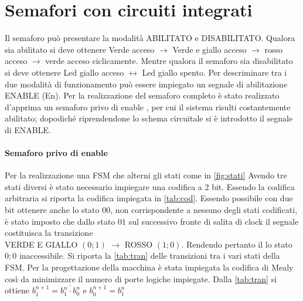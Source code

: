 \documentclass[a4paper,11pt]{article}
\begin{document}
\section{Semafori con circuiti integrati }
Il semaforo può presentare la modalità ABILITATO e DISABILITATO. Qualora sia abilitato si deve 
ottenere Verde acceso $\longrightarrow$ Verde e 
giallo acceso $\longrightarrow$ rosso acceso $\longrightarrow$ 
verde acceso  ciclicamente. Mentre qualora il semaforo sia disabilitato si deve ottenere
Led giallo acceso $\leftrightarrow$ Led giallo spento.
Per descriminare tra i due modalità di funzionamento può essere impiegato un segnale di abilitazione 
ENABLE (En).
Per la realizzazione del semaforo completo è stato realizzato d'apprima un semaforo privo di enable , per cui il sistema risulti costantemente abilitato;
dopodiché riprendendone lo schema circuitale si è introdotto il segnale di ENABLE.
\paragraph{Semaforo privo di enable}
Per la realizzazione una FSM che alterni gli stati come in \figurename{\ref{fig:stati}}
Avendo tre stati diversi è stato necessario impiegare una codifica a 2 bit.
Essendo la codifica arbitraria si riporta la codifica impiegata in 
\tablename{\ref{tab:cod}}.
Essendo possibile con due bit ottenere anche lo stato $00$,  non corrispondente a nessuno degli stati codificati,
è stato imposto che dallo stato $01$ sul successivo fronte di salita di clock il segnale costituisca
la transizione \\VERDE E GIALLO $(0;1)$  $\longrightarrow$ ROSSO $(1;0)$.
Rendendo pertanto il lo stato $0;0$ inaccessibile.
Si riporta la \tablename{ \ref{tab:tran}} delle transizioni tra i vari stati della FSM.
Per la progettazione della macchina è stata impiegata la codifica di Mealy così da minimizzare il numero di porte logiche impiegate.
Dalla \tablename{ \ref{tab:tran}} si ottiene  $b_{1}^{n+1} =  \overline{b_{1}^{n} \cdot b_{0}^{n}}$ e $b_{0}^{n+1} = b_{1}^{n}$
\end{document}
